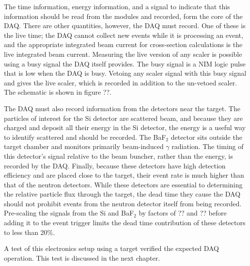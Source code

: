 The time information, energy information, and a signal to indicate that this information should be read from the modules and recorded, form the core of the DAQ.  There are other quantities, however, the DAQ must record.  One of these is the live time; the DAQ cannot collect new events while it is processing an event, and the appropriate integrated beam current for cross-section calculations is the live integrated beam current.  Measuring the live version of any scaler is possible using a busy signal the DAQ itself provides.  The busy signal is a NIM logic pulse that is low when the DAQ is busy.  Vetoing any scaler signal with this busy signal and gives the live scaler, which is recorded in addition to the un-vetoed scaler.  The schematic is shown in figure ??.

The DAQ must also record information from the detectors near the target.  The particles of interest for the Si detector are scattered  beam, and because they are charged and deposit all their energy in the Si detector, the energy is a useful way to identify scattered  and should be recorded.  The BaF$_2$ detector sits outside the target chamber and monitors primarily beam-induced $\gamma$ radiation.  The timing of this detector's signal relative to the beam buncher, rather than the energy, is recorded by the DAQ.  Finally, because these detectors have high detection efficiency and are placed close to the target, their event rate is much higher than that of the neutron detectors.  While these detectors are essential to determining the relative particle flux through the target, the dead time they cause the DAQ should not prohibit events from the neutron detector itself from being recorded.  Pre-scaling the signals from the Si and BaF$_2$ by factors of ?? and ?? before adding it to the event trigger limits the dead time contribution of these detectors to less than 20\%.

A test of this electronics setup using a  target verified the expected DAQ operation.  This test is discussed in the next chapter. 

%
% 
% 
